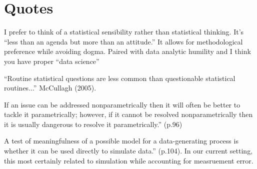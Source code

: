 \documentclass[11pt]{amsart}
\begin{document}
\section{Quotes}

I prefer to think of a statistical sensibility rather than statistical thinking. It’s “less than an agenda but more than an attitude.”  It allows for methodological preference while avoiding dogma. Paired with data analytic humility and I think you have proper “data science”

“Routine statistical questions are less common than questionable statistical routines...” McCullagh (2005).

If an issue can be addressed nonparametrically then it will often be better to tackle it parametrically; however, if it cannot be resolved nonparametrically then it is usually dangerous to resolve it parametrically.” (p.96)

A test of meaningfulness of a possible model for a data-generating process is whether it can be used directly to simulate data.” (p.104).  In our current setting, this most certainly related to simulation while accounting for measruement error.
\end{document}
